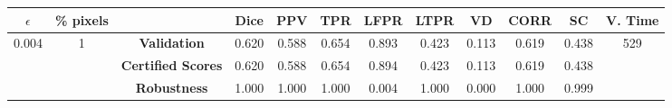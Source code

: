 \begin{longtable}{ c  c | c | c  c  c  c  c  c  c c c}
\toprule \textbf{$\epsilon$} & \textbf{\% pixels} & & \textbf{Dice} & \textbf{PPV} & \textbf{TPR} & \textbf{LFPR} & \textbf{LTPR} & \textbf{VD} & \textbf{CORR} & \textbf{SC} & \textbf{V. Time} \\
\midrule 
\multirow{3}{*}{0.004}  & \multirow{3}{*}{1} &\textbf{Validation} & 0.620 & 0.588 & 0.654 & 0.893 & 0.423 & 0.113 & 0.619 & 0.438 & \multirow{3}{*}{529} \\
 & & \textbf{Certified Scores} & 0.620 & 0.588 & 0.654 & 0.894 & 0.423 & 0.113 & 0.619 & 0.438 & \\
& & \textbf{Robustness} & 1.000 & 1.000 & 1.000 & 0.004 & 1.000 & 0.000 & 1.000 & 0.999 & \\
\end{longtable}